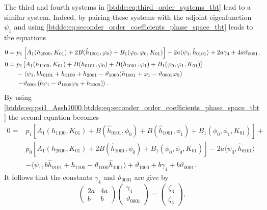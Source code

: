 The third and fourth systems in \cref{btdde:eq:third_order_systems_tbt} lead to a
similar system. Indeed, by pairing these systems with the adjoint eigenfunction
$\psi_1$ and using \cref{btdde:eq:seconder_order_coefficients_phase_space_tbt} leads to the equations
\begin{equation}
\label{btdde:eq:pairing_second_two_equations}
\begin{aligned}
    0 ={}& p_1\left[A_1(h_{2000},K_{01}) + 2 B(\hat h_{1001},\phi_0) + B_1(\phi_0,\phi_0,K_{01})\right] 
    \process{%
        \\ &
    }
 - 2a\langle \psi_1, \hat h_{0101} \rangle + 2a \gamma_4 + 4 a \vartheta_{0001}, \\
0 ={}& p_1\left[A_1(h_{1100},K_{01}) + B(h_{0101},\phi_0) + B(h_{1001},\phi_1) + B_1(\phi_0,\phi_1,K_{01})\right] \\
                        & -\left< \psi_1, b h_{0101} + h_{1100} + h_{2001} - \vartheta_{1000} (h_{1001} + \phi_1 - \vartheta_{0001} \phi_0) \right. \\
                        & \left. - \vartheta_{0001} (b \phi_1 - \vartheta_{1000} \phi_0 + h_{2000}) \right>. \\
\end{aligned}
\end{equation}
By using \cref{btdde:eq:psi1_Assh1000,btdde:eq:seconder_order_coefficients_phase_space_tbt} the second equation becomes
\begin{align*}
0 ={}& p_1\left[A_1(h_{1100},K_{01}) + B(\hat h_{0101},\phi_0) + B(\hat h_{1001},\phi_1) + B_1(\phi_0,\phi_1,K_{01})\right] + \\
     & p_0 \left[A_1(h_{2000},K_{01}) + 2 B(\hat h_{1001},\phi_0) + B_1(\phi_0,\phi_0,K_{01})\right] - 2 a \langle \psi_0, \hat h_{0101} \rangle \\
                        & -\langle \psi_1, b \hat h_{0101} + h_{1100} - \vartheta_{1000} \hat h_{1001} \rangle  + \vartheta_{1000} 
                          + b \gamma_4 + b \vartheta_{0001}.
\end{align*}
It follows that the constants $\gamma_4$ and $\vartheta_{0001}$ are give by
\begin{equation}
\label{btdde:eq:gamma_4_theta0001_tbt}
\begin{pmatrix}
    2a &  4a \\
     b &   b 
\end{pmatrix}
\begin{pmatrix}
    \gamma_4 \\
    \vartheta_{0001}
\end{pmatrix}
=
\begin{pmatrix}
    \zeta_3 \\
    \zeta_4 
\end{pmatrix},
\end{equation}
